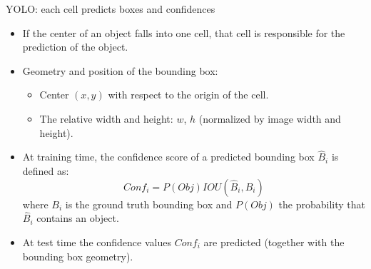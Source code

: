 \documentclass[xcolor=pdftex,dvipsnames,table]{beamer}
\begin{document}


\begin{frame}{YOLO: each cell predicts boxes and confidences}
\begin{itemize}
   \item If the center of an object falls into one cell, that cell is responsible for the prediction of the object. 
   \item Geometry and position of the bounding box: 
   \begin{itemize}
      \item Center $(x, y)$ with respect to the origin of the cell.
      \item The relative width and height: $w$, $h$ (normalized by image width and height). 
   \end{itemize}
   \item At training time, the confidence score of a predicted bounding box $\hat{B}_i$ is defined as:
   \begin{equation}\nonumber
      Conf_i = P(Obj) IOU(\hat{B}_i, B_i)
   \end{equation}
   where $B_i$ is the ground truth bounding box and $P(Obj)$ the probability that $\hat{B}_i$ contains an object.
   \item At test time the confidence values $Conf_i$ are predicted (together with the bounding box geometry). 
\end{itemize}
\end{frame}
\end{document}
